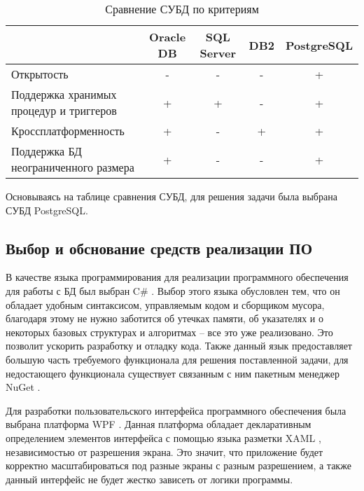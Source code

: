 \documentclass[a4paper]{bmstu}
\begin{document}
\begin{table}[H]
	\caption{Сравнение СУБД по критериям}
	\begin{center}
		\begin{tabular}{| p{5 cm} | c | c | c | c |} 
			\hline
			
			\textbf{} & \textbf{Oracle DB} & \textbf{SQL Server} & \textbf{DB2} & \textbf{PostgreSQL} \\  
			
			\hline
			
			Открытость & - & - & - & + \\
			
			\hline
			
			Поддержка хранимых процедур и триггеров & + & + & - & + \\
			
			\hline
			
			Кроссплатформенность & + & - & + & + \\
			
			\hline
			
			Поддержка БД неограниченного размера & + & - & - & + \\
			
			\hline
		\end{tabular}
	\end{center}
\end{table}

Основываясь на таблице сравнения СУБД, для решения задачи была выбрана СУБД PostgreSQL.

\subsection*{Выбор и обснование средств реализации ПО}

В качестве языка программирования для реализации программного обеспечения для работы с БД был выбран C\# \cite{c-sharp}. Выбор этого языка обусловлен тем, что он обладает удобным синтаксисом, управляемым кодом и сборщиком мусора, благодаря этому не нужно заботится об утечках памяти, об указателях и о некоторых базовых структурах и алгоритмах -- все это уже реализовано. Это позволит ускорить разработку и отладку кода. Также данный язык предоставляет большую часть требуемого функционала для решения поставленной задачи, для недостающего функционала существует связанным с ним пакетным менеджер NuGet \cite{nuget}.

Для разработки пользовательского интерфейса программного обеспечения была выбрана платформа WPF \cite{wpf}. Данная платформа обладает декларативным определением элементов интерфейса с помощью языка разметки XAML \cite{xaml}, независимостью от разрешения экрана. Это значит, что приложение будет корректно масштабироваться под разные экраны с разным разрешением, а также данный интерфейс не будет жестко зависеть от логики программы.
\end{document}
